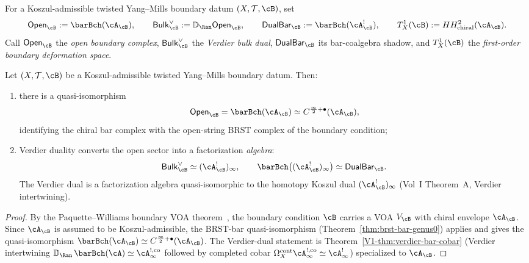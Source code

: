 \begin{notation}
\label{not:twisted-ym-boundary-objects}
For a Koszul-admissible twisted Yang--Mills boundary datum $(X,\mathcal{T},\cB)$, set
\[
\mathsf{Open}_{\cB} := \barBch(\cA_{\cB}),
\qquad
\mathsf{Bulk}^{\vee}_{\cB} := \mathbb{D}_{\Ran}\mathsf{Open}_{\cB},
\qquad
\mathsf{DualBar}_{\cB} := \barBch(\cA_{\cB}^!),
\qquad
T^1_X(\cB) := HH^2_{\mathrm{chiral}}(\cA_{\cB}).
\]
Call $\mathsf{Open}_{\cB}$ the \emph{open boundary complex},
$\mathsf{Bulk}^{\vee}_{\cB}$ the \emph{Verdier bulk dual},
$\mathsf{DualBar}_{\cB}$ its bar-coalgebra shadow, and
$T^1_X(\cB)$ the \emph{first-order boundary deformation space}.
\end{notation}

\begin{theorem}
\label{thm:twisted-ym-boundary-brst}
Let $(X,\mathcal{T},\cB)$ be a Koszul-admissible twisted Yang--Mills boundary datum.
Then:
\begin{enumerate}[label=(\alph*)]
\item there is a quasi-isomorphism
\[
\mathsf{Open}_{\cB} = \barBch(\cA_{\cB}) \simeq C^{\frac{\infty}{2}+\bullet}(\cA_{\cB}),
\]
identifying the chiral bar complex with the open-string BRST complex of the boundary condition;
\item Verdier duality converts the open sector into a factorization
\emph{algebra}:
\[
\mathsf{Bulk}^{\vee}_{\cB}
\simeq (\cA_{\cB}^!)_\infty,
\qquad
\barBch\bigl((\cA_{\cB}^!)_\infty\bigr)
\simeq \mathsf{DualBar}_{\cB}.
\]
The Verdier dual is a factorization algebra quasi-isomorphic to the homotopy Koszul dual $(\cA_{\cB}^!)_\infty$ (Vol~I Theorem~A, Verdier intertwining).
\end{enumerate}
\end{theorem}

\begin{proof}
By the Paquette--Williams boundary VOA theorem~{\cite{PW22}}, the boundary condition $\cB$ carries a
VOA $V_{\cB}$ with chiral envelope $\cA_{\cB}$. Since $\cA_{\cB}$ is assumed to be
Koszul-admissible, the BRST-bar quasi-isomorphism (Theorem~\ref{thm:brst-bar-genus0}) applies and gives the quasi-isomorphism
$\barBch(\cA_{\cB}) \simeq C^{\frac{\infty}{2}+\bullet}(\cA_{\cB})$. The Verdier-dual statement is
Theorem~\ref{V1-thm:verdier-bar-cobar} (Verdier intertwining
$\mathbb{D}_{\Ran}\, \barBch(\cA) \simeq \cA^{!,\mathrm{co}}_\infty$
followed by completed cobar
$\Omega_X^{\mathrm{cont}}\cA^{!,\mathrm{co}}_\infty\simeq\cA^!_\infty$)
specialized to $\cA_{\cB}$.
\end{proof}

